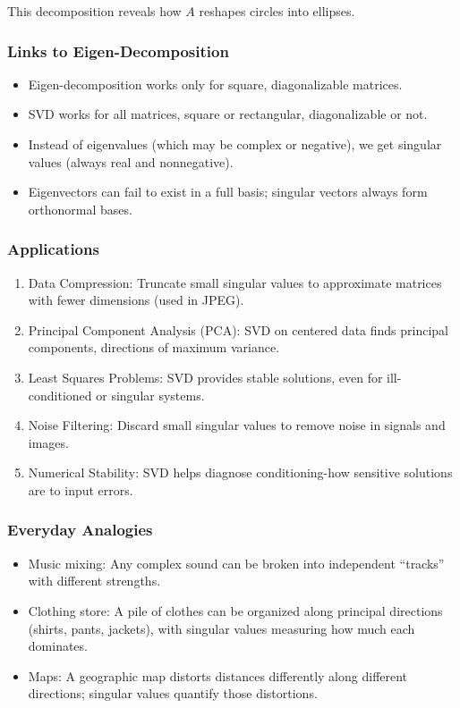 \documentclass[
  letterpaper,
  DIV=11,
  numbers=noendperiod]{scrreprt}
\providecommand{\tightlist}{%
  \setlength{\itemsep}{0pt}\setlength{\parskip}{0pt}}
\begin{document}
This decomposition reveals how \(A\) reshapes circles into ellipses.

\subsubsection{Links to
Eigen-Decomposition}\label{links-to-eigen-decomposition}

\begin{itemize}
\tightlist
\item
  Eigen-decomposition works only for square, diagonalizable matrices.
\item
  SVD works for all matrices, square or rectangular, diagonalizable or
  not.
\item
  Instead of eigenvalues (which may be complex or negative), we get
  singular values (always real and nonnegative).
\item
  Eigenvectors can fail to exist in a full basis; singular vectors
  always form orthonormal bases.
\end{itemize}

\subsubsection{Applications}\label{applications-43}

\begin{enumerate}
\def\labelenumi{\arabic{enumi}.}
\tightlist
\item
  Data Compression: Truncate small singular values to approximate
  matrices with fewer dimensions (used in JPEG).
\item
  Principal Component Analysis (PCA): SVD on centered data finds
  principal components, directions of maximum variance.
\item
  Least Squares Problems: SVD provides stable solutions, even for
  ill-conditioned or singular systems.
\item
  Noise Filtering: Discard small singular values to remove noise in
  signals and images.
\item
  Numerical Stability: SVD helps diagnose conditioning-how sensitive
  solutions are to input errors.
\end{enumerate}

\subsubsection{Everyday Analogies}\label{everyday-analogies-77}

\begin{itemize}
\tightlist
\item
  Music mixing: Any complex sound can be broken into independent
  ``tracks'' with different strengths.
\item
  Clothing store: A pile of clothes can be organized along principal
  directions (shirts, pants, jackets), with singular values measuring
  how much each dominates.
\item
  Maps: A geographic map distorts distances differently along different
  directions; singular values quantify those distortions.
\end{itemize}
\end{document}
